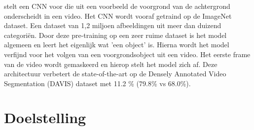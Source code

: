 \npar \cite{oneshot-video-segm} stelt een CNN voor die uit een voorbeeld de voorgrond van de achtergrond onderscheidt in een video. Het CNN wordt vooraf getraind op de ImageNet dataset. Een dataset van 1,2 miljoen afbeeldingen uit meer dan duizend categori\"en. Door deze pre-training op een zeer ruime dataset is het model algemeen en leert het eigenlijk wat 'een object' is. Hierna wordt het model verfijnd voor het volgen van een voorgrondsobject uit een video. Het eerste frame van de video wordt gemaskeerd en hierop stelt het model zich af. Deze architectuur verbetert de state-of-the-art op de Densely Annotated Video Segmentation (DAVIS) dataset met 11.2 \% (79.8\% vs 68.0\%).

\section{Doelstelling}







 